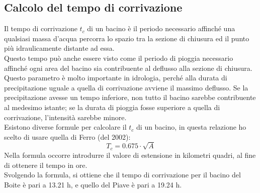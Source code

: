 \subsection{Calcolo del tempo di corrivazione}
Il tempo di corrivazione $t_c$ di un bacino è il periodo necessario affinché una qualsiasi massa d'acqua percorra lo spazio tra la sezione di chiusura ed il punto più idraulicamente distante ad essa.\\
Questo tempo può anche essere visto come il periodo di pioggia necessario affinché ogni area del bacino sia contribuente al deflusso alla sezione di chiusura.\\
Questo parametro è molto importante in idrologia, perché alla durata di precipitazione uguale a quella di corrivazione avviene il massimo deflusso. Se la precipitazione avesse un tempo inferiore, non tutto il bacino sarebbe contribuente al medesimo istante; se la durata di pioggia fosse superiore a quella di corrivazione, l'intensità sarebbe minore.\\
Esistono diverse formule per calcolare il $t_c$ di un bacino, in questa relazione ho scelto di usare quella di Ferro (del 2002):
\begin{equation}
    T_c = 0.675 \cdot \sqrt{A}
\end{equation}
Nella formula occorre introdurre il valore di estensione in kilometri quadri, al fine di ottenere il tempo in ore.\\
Svolgendo la formula, si ottiene che il tempo di corrivazione per il bacino del Boite è pari a 13.21 h, e quello del Piave è pari a 19.24 h.